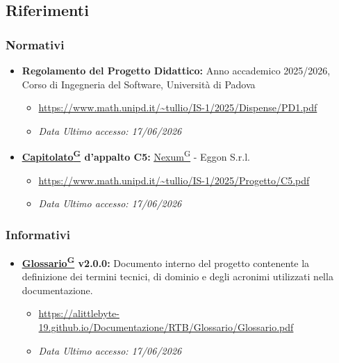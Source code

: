 \documentclass[a4paper,12pt]{article}
\providecommand{\glslink}[2]{\href{https://alittlebyte-19.github.io/Documentazione/glossario.html\#gls-#1}{\underline{#2}\textsuperscript{\scriptsize G}}}
\begin{document}
\subsection{Riferimenti}

\subsubsection{Normativi}
\begin{itemize}
    \item \textbf{Regolamento del Progetto Didattico:} Anno accademico 2025/2026, Corso di Ingegneria del Software, Università di Padova
    \begin{itemize}
        \item \url{https://www.math.unipd.it/~tullio/IS-1/2025/Dispense/PD1.pdf}
        \item \textit{Data Ultimo accesso: 17/06/2026} 
    \end{itemize}
    
    
    \item \textbf{\glslink{capitolato}{Capitolato} d'appalto C5:} \glslink{nexum}{Nexum} - Eggon S.r.l.
    \begin{itemize}
        \item \url{https://www.math.unipd.it/~tullio/IS-1/2025/Progetto/C5.pdf}
        \item \textit{Data Ultimo accesso: 17/06/2026} 
    \end{itemize}
    
\end{itemize}

\subsubsection{Informativi}
\begin{itemize}
    \item \textbf{\glslink{glossario}{Glossario} v2.0.0:} Documento interno del progetto contenente la definizione dei termini tecnici, di dominio e degli acronimi utilizzati nella documentazione.
    \begin{itemize}
        \item \url{https://alittlebyte-19.github.io/Documentazione/RTB/Glossario/Glossario.pdf}
        \item \textit{Data Ultimo accesso: 17/06/2026}
    \end{itemize}
\end{itemize}
\end{document}
